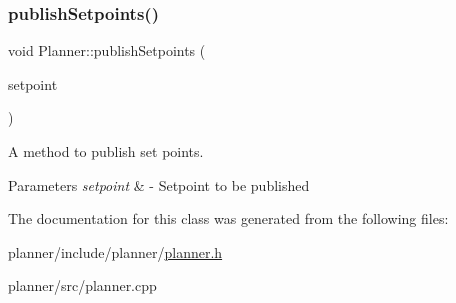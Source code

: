 \subsubsection{\texorpdfstring{publish\+Setpoints()}{publishSetpoints()}}
{\footnotesize\ttfamily void Planner\+::publish\+Setpoints (\begin{DoxyParamCaption}\item[{const ackermann\+\_\+msgs\+::\+Ackermann\+Drive\+Stamped \&}]{setpoint }\end{DoxyParamCaption})}



A method to publish set points. 


\begin{DoxyParams}{Parameters}
{\em setpoint} & -\/ Setpoint to be published \\
\hline
\end{DoxyParams}


The documentation for this class was generated from the following files\+:\begin{DoxyCompactItemize}
\item 
planner/include/planner/\hyperlink{planner_8h}{planner.\+h}\item 
planner/src/planner.\+cpp\end{DoxyCompactItemize}
